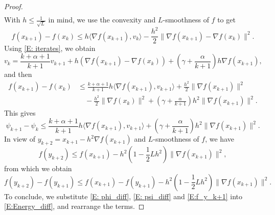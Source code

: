 \documentclass[10pt,a4paper]{amsart}
\begin{document}
\begin{proof}
\begin{align}
\end{align}
With $h\le\frac{1}{\sqrt{L}}$ in mind, we use the convexity and $L$-smoothness of $f$ to get
$$ f(x_{k+1}) - f(x_k) \le h \langle \nabla f(x_{k+1}), v_k \rangle - \frac{h^2}{2}\| \nabla f(x_{k+1}) - \nabla f(x_k) \|^2. $$
Using \eqref{E: iterates}, we obtain
$$ v_k = \frac{k+\alpha+1}{k+1} v_{k+1} + h\left( \nabla f(x_{k+1}) - \nabla f(x_k) \right) + \left( \gamma + \frac{\alpha}{k+1} \right) h \nabla f(x_{k+1}), $$
and then
\begin{align*}
f(x_{k+1}) - f(x_k)
&\le \frac{k+\alpha+1}{k+1} h \langle \nabla f(x_{k+1}), v_{k+1} \rangle
     + \frac{h^2}{2}\| \nabla f(x_{k+1}) \|^2 \\
&\quad  - \frac{h^2}{2}\| \nabla f(x_k) \|^2 
     + \left( \gamma + \frac{\alpha}{k+1} \right) h^2 \| \nabla f(x_{k+1}) \|^2.
\end{align*}
This gives
\begin{equation}\label{E: psi_diff}
\psi_{k+1} - \psi_k 
\le \frac{k+\alpha+1}{k+1} h \langle \nabla f(x_{k+1}), v_{k+1} \rangle
   + \left( \gamma + \frac{\alpha}{k+1} \right) h^2 \| \nabla f(x_{k+1}) \|^2.
\end{equation}
In view of $y_{k+2} = x_{k+1} - h^2\nabla f(x_{k+1})$ and $L$-smoothness of $f$, we have
$$ f(y_{k+2}) \le f(x_{k+1}) - h^2\left( 1 - \frac{1}{2}Lh^2 \right)\| \nabla f(x_{k+1}) \|^2, $$
from which we obtain
\begin{equation} \label{E:f_y_k+1}
f(y_{k+2}) - f(y_{k+1}) \le f(x_{k+1}) - f(y_{k+1}) - h^2\left( 1 - \frac{1}{2}Lh^2 \right)\| \nabla f(x_{k+1}) \|^2.  
\end{equation}
To conclude, we substitute \eqref{E: phi_diff}, \eqref{E: psi_diff} and \eqref{E:f_y_k+1} into \eqref{E:Energy_diff}, and rearrange the terms.
\end{proof}
\end{document}
